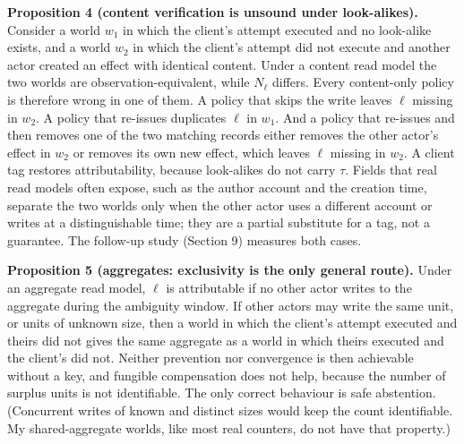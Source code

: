 \documentclass[
  10pt,
]{article}
\begin{document}
\textbf{Proposition 4 (content verification is unsound under
look-alikes).} Consider a world \(w_1\) in which the client's attempt
executed and no look-alike exists, and a world \(w_2\) in which the
client's attempt did not execute and another actor created an effect
with identical content. Under a content read model the two worlds are
observation-equivalent, while \(N_\ell\) differs. Every content-only
policy is therefore wrong in one of them. A policy that skips the write
leaves \(\ell\) missing in \(w_2\). A policy that re-issues duplicates
\(\ell\) in \(w_1\). And a policy that re-issues and then removes one of
the two matching records either removes the other actor's effect in
\(w_2\) or removes its own new effect, which leaves \(\ell\) missing in
\(w_2\). A client tag restores attributability, because look-alikes do
not carry \(\tau\). Fields that real read models often expose, such as
the author account and the creation time, separate the two worlds only
when the other actor uses a different account or writes at a
distinguishable time; they are a partial substitute for a tag, not a
guarantee. The follow-up study (Section 9) measures both cases.

\textbf{Proposition 5 (aggregates: exclusivity is the only general
route).} Under an aggregate read model, \(\ell\) is attributable if no
other actor writes to the aggregate during the ambiguity window. If
other actors may write the same unit, or units of unknown size, then a
world in which the client's attempt executed and theirs did not gives
the same aggregate as a world in which theirs executed and the client's
did not. Neither prevention nor convergence is then achievable without a
key, and fungible compensation does not help, because the number of
surplus units is not identifiable. The only correct behaviour is safe
abstention. (Concurrent writes of known and distinct sizes would keep
the count identifiable. My shared-aggregate worlds, like most real
counters, do not have that property.)
\end{document}
